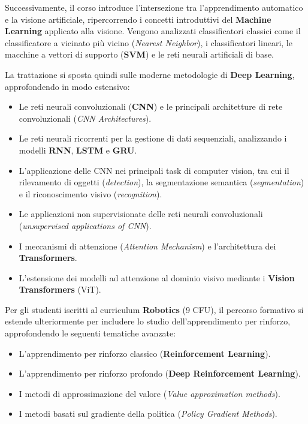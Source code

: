 ﻿\documentclass[11pt, a4paper]{article}
\begin{document}
Successivamente, il corso introduce l'intersezione tra l'apprendimento automatico e la visione artificiale, ripercorrendo i concetti introduttivi del \textbf{Machine Learning} applicato alla visione. Vengono analizzati classificatori classici come il classificatore a vicinato più vicino (\emph{Nearest Neighbor}), i classificatori lineari, le macchine a vettori di supporto (\textbf{SVM}) e le reti neurali artificiali di base.

La trattazione si sposta quindi sulle moderne metodologie di \textbf{Deep Learning}, approfondendo in modo estensivo:
\begin{itemize}[noitemsep]
    \item Le reti neurali convoluzionali (\textbf{CNN}) e le principali architetture di rete convoluzionali (\emph{CNN Architectures}).
    \item Le reti neurali ricorrenti per la gestione di dati sequenziali, analizzando i modelli \textbf{RNN}, \textbf{LSTM} e \textbf{GRU}.
    \item L'applicazione delle CNN nei principali task di computer vision, tra cui il rilevamento di oggetti (\emph{detection}), la segmentazione semantica (\emph{segmentation}) e il riconoscimento visivo (\emph{recognition}).
    \item Le applicazioni non supervisionate delle reti neurali convoluzionali (\emph{unsupervised applications of CNN}).
    \item I meccanismi di attenzione (\emph{Attention Mechanism}) e l'architettura dei \textbf{Transformers}.
    \item L'estensione dei modelli ad attenzione al dominio visivo mediante i \textbf{Vision Transformers} (ViT).
\end{itemize}

Per gli studenti iscritti al curriculum \textbf{Robotics} (9 CFU), il percorso formativo si estende ulteriormente per includere lo studio dell'apprendimento per rinforzo, approfondendo le seguenti tematiche avanzate:
\begin{itemize}[noitemsep]
    \item L'apprendimento per rinforzo classico (\textbf{Reinforcement Learning}).
    \item L'apprendimento per rinforzo profondo (\textbf{Deep Reinforcement Learning}).
    \item I metodi di approssimazione del valore (\emph{Value approximation methods}).
    \item I metodi basati sul gradiente della politica (\emph{Policy Gradient Methods}).
\end{itemize}
\end{document}
